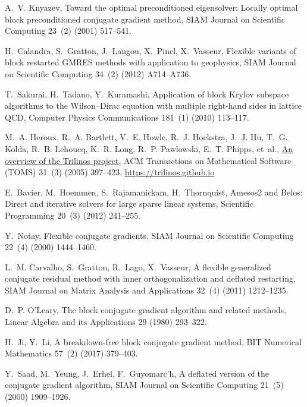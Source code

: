 \documentclass[3p,11pt]{elsarticle}
\begin{document}
\begin{thebibliography}{10}
A.~V. Knyazev, Toward the optimal preconditioned eigensolver: Locally optimal
  block preconditioned conjugate gradient method, SIAM Journal on Scientific
  Computing 23~(2) (2001) 517--541.

H.~Calandra, S.~Gratton, J.~Langou, X.~Pinel, X.~Vasseur, Flexible variants of
  block restarted {GMRES} methods with application to geophysics, SIAM Journal
  on Scientific Computing 34~(2) (2012) A714--A736.

T.~Sakurai, H.~Tadano, Y.~Kuramashi, Application of block {K}rylov subspace
  algorithms to the {W}ilson--{D}irac equation with multiple right-hand sides
  in lattice {QCD}, Computer Physics Communications 181~(1) (2010) 113--117.

M.~A. Heroux, R.~A. Bartlett, V.~E. Howle, R.~J. Hoekstra, J.~J. Hu, T.~G.
  Kolda, R.~B. Lehoucq, K.~R. Long, R.~P. Pawlowski, E.~T. Phipps, et~al.,
  \href{https://trilinos.github.io}{An overview of the {T}rilinos project}, ACM
  Transactions on Mathematical Software (TOMS) 31~(3) (2005) 397--423.
\newline\urlprefix\url{https://trilinos.github.io}

E.~Bavier, M.~Hoemmen, S.~Rajamanickam, H.~Thornquist, {Amesos2} and {Belos}:
  Direct and iterative solvers for large sparse linear systems, Scientific
  Programming 20~(3) (2012) 241--255.

Y.~Notay, Flexible conjugate gradients, SIAM Journal on Scientific Computing
  22~(4) (2000) 1444--1460.

L.~M. Carvalho, S.~Gratton, R.~Lago, X.~Vasseur, A flexible generalized
  conjugate residual method with inner orthogonalization and deflated
  restarting, SIAM Journal on Matrix Analysis and Applications 32~(4) (2011)
  1212--1235.

D.~P. O'Leary, The block conjugate gradient algorithm and related methods,
  Linear Algebra and its Applications 29 (1980) 293--322.

H.~Ji, Y.~Li, A breakdown-free block conjugate gradient method, BIT Numerical
  Mathematics 57~(2) (2017) 379--403.

Y.~Saad, M.~Yeung, J.~Erhel, F.~Guyomarc'h, A deflated version of the conjugate
  gradient algorithm, SIAM Journal on Scientific Computing 21~(5) (2000)
  1909--1926.


\end{thebibliography}
\end{document}
